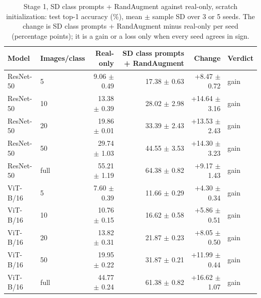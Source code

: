 \begin{table}[H]
\centering
\caption{Stage 1, SD class prompts + RandAugment against real-only, scratch initialization: test top-1 accuracy (\%), mean $\pm$ sample SD over 3 or 5 seeds. The change is SD class prompts + RandAugment minus real-only per seed (percentage points); it is a gain or a loss only when every seed agrees in sign.}
\label{tab:stage1-scratch-accuracy-sd_prompt_randaugment-test}
\begin{tabular}{llrrrl}
\toprule
Model & Images/class & Real-only & SD class prompts + RandAugment & Change & Verdict \\
\midrule
ResNet-50 & 5 & 9.06 $\pm$ 0.49 & 17.38 $\pm$ 0.63 & +8.47 $\pm$ 0.72 & gain \\
ResNet-50 & 10 & 13.38 $\pm$ 0.39 & 28.02 $\pm$ 2.98 & +14.64 $\pm$ 3.16 & gain \\
ResNet-50 & 20 & 19.86 $\pm$ 0.01 & 33.39 $\pm$ 2.43 & +13.53 $\pm$ 2.43 & gain \\
ResNet-50 & 50 & 29.74 $\pm$ 1.03 & 44.55 $\pm$ 3.53 & +14.30 $\pm$ 3.23 & gain \\
ResNet-50 & full & 55.21 $\pm$ 1.19 & 64.38 $\pm$ 0.82 & +9.17 $\pm$ 1.43 & gain \\
\midrule
ViT-B/16 & 5 & 7.60 $\pm$ 0.39 & 11.66 $\pm$ 0.29 & +4.30 $\pm$ 0.34 & gain \\
ViT-B/16 & 10 & 10.76 $\pm$ 0.15 & 16.62 $\pm$ 0.58 & +5.86 $\pm$ 0.51 & gain \\
ViT-B/16 & 20 & 13.82 $\pm$ 0.31 & 21.87 $\pm$ 0.23 & +8.05 $\pm$ 0.50 & gain \\
ViT-B/16 & 50 & 19.95 $\pm$ 0.22 & 31.87 $\pm$ 0.21 & +11.99 $\pm$ 0.44 & gain \\
ViT-B/16 & full & 44.77 $\pm$ 0.24 & 61.38 $\pm$ 0.82 & +16.62 $\pm$ 1.07 & gain \\
\bottomrule
\end{tabular}
\end{table}
